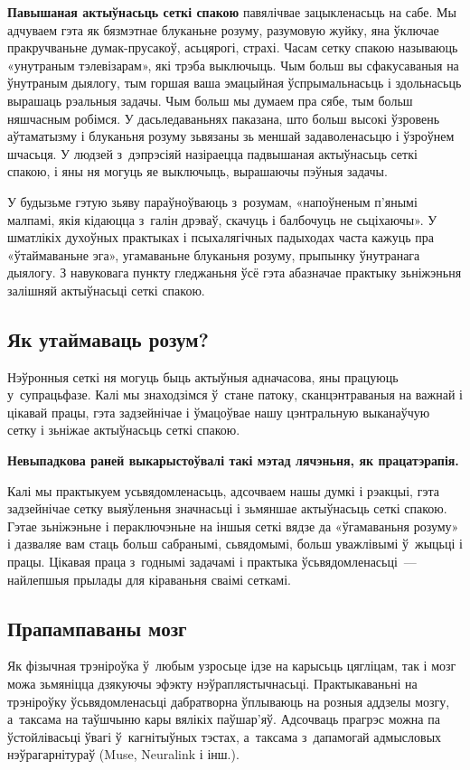 \textbf{Павышаная актыўнасьць сеткі спакою} павялічвае зацыкленасьць на сабе. Мы адчуваем гэта як бязмэтнае блуканьне розуму, разумовую жуйку, яна ўключае пракручваньне думак-прусакоў, асьцярогі, страхі. Часам сетку спакою называюць «унутраным тэлевізарам», які трэба выключыць. Чым больш вы сфакусаваныя на ўнутраным дыялогу, тым горшая ваша эмацыйная ўспрымальнасьць і здольнасьць вырашаць рэальныя задачы. Чым больш мы думаем пра сябе, тым больш няшчасным робімся. У дасьледаваньнях паказана, што больш высокі ўзровень аўтаматызму і блуканьня розуму зьвязаны зь меншай задаволенасьцю і ўзроўнем шчасьця. У людзей з~дэпрэсіяй назіраецца падвышаная актыўнасьць сеткі спакою, і яны ня могуць яе выключыць, вырашаючы пэўныя задачы.

У будызьме гэтую зьяву параўноўваюць з~розумам, «напоўненым п'янымі малпамі, якія кідаюцца з~галін дрэваў, скачуць і балбочуць не сьціхаючы». У шматлікіх духоўных практыках і псыхалягічных падыходах часта кажуць пра «ўтаймаваньне эга», угамаваньне блуканьня розуму, прыпынку ўнутранага дыялогу. З навуковага пункту гледжаньня ўсё гэта абазначае практыку зьніжэньня залішняй актыўнасьці сеткі спакою.

\subsection*{Як утаймаваць розум?}

Нэўронныя сеткі ня могуць быць актыўныя адначасова, яны працуюць у~супрацьфазе. Калі мы знаходзімся ў~стане патоку, сканцэнтраваныя на важнай і цікавай працы, гэта задзейнічае і ўмацоўвае нашу цэнтральную выканаўчую сетку і зьніжае актыўнасьць сеткі спакою.

\textbf{Невыпадкова раней выкарыстоўвалі такі мэтад лячэньня, як працатэрапія.}

Калі мы практыкуем усьвядомленасьць, адсочваем нашы думкі і рэакцыі, гэта задзейнічае сетку выяўленьня значнасьці і зьмяншае актыўнасьць сеткі спакою. Гэтае зьніжэньне і пераключэньне на іншыя сеткі вядзе да «ўгамаваньня розуму» і дазваляе вам стаць больш сабранымі, сьвядомымі, больш уважлівымі ў~жыцьці і працы. Цікавая праца з~годнымі задачамі і практыка ўсьвядомленасьці~--- найлепшыя прылады для кіраваньня сваімі сеткамі.

\subsection*{Прапампаваны мозг}

Як фізычная трэніроўка ў~любым узросьце ідзе на карысьць цягліцам, так і мозг можа зьмяніцца дзякуючы эфэкту нэўраплястычнасьці. Практыкаваньні на трэніроўку ўсьвядомленасьці дабратворна ўплываюць на розныя аддзелы мозгу, а~таксама на таўшчыню кары вялікіх паўшар'яў. Адсочваць прагрэс можна па ўстойлівасьці ўвагі ў~кагнітыўных тэстах, а~таксама з~дапамогай адмысловых нэўрагарнітураў (Muse, Neuralink і інш.).

